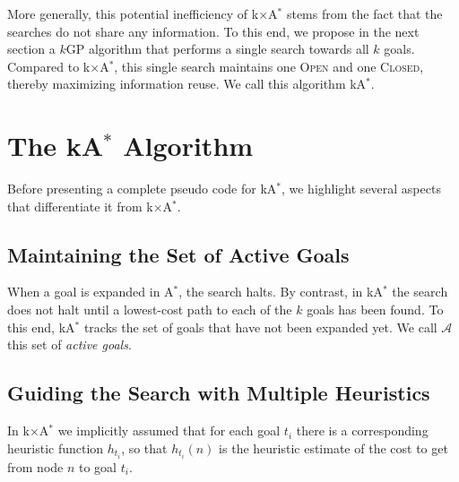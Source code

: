 \documentclass[twoside,11pt]{article}
\newcommand{\kgs}{$k$GP\xspace}
\newcommand{\astar}{A$^*$\xspace}
\newcommand{\kastar}{kA$^*$\xspace}
\newcommand{\kxastar}{k$\times$A$^*$\xspace}
\newcommand{\open}{\textsc{Open}\xspace}
\newcommand{\closed}{\textsc{Closed}\xspace}
\newcommand{\activeg}{\mathcal{A}}
\begin{document}
More generally, this potential inefficiency of \kxastar stems from the fact that the searches do not share any information. To this end, we propose in the next section a \kgs algorithm that performs a single search towards all $k$ goals. Compared to \kxastar, this single search maintains one  \open and one \closed, thereby maximizing information reuse. We call this algorithm \kastar. 



\section{The \kastar Algorithm}
\label{sec:one-k-goal-search}

Before presenting a complete pseudo code for \kastar, we highlight several aspects that differentiate it from \kxastar.


\subsection{Maintaining the Set of Active Goals}

When a goal is expanded in \astar, the search halts.
By contrast, in \kastar the search does not halt until a lowest-cost path to each of the $k$ goals has been found.
To this end, \kastar tracks the set of goals that have not been expanded yet. 
We call $\activeg$ this set of \emph{active goals}.

\subsection{Guiding the Search with Multiple Heuristics}

In \kxastar we implicitly assumed that for each goal $t_i$ there is a corresponding heuristic function $h_{t_i}$, so that $h_{t_i}(n)$ is the heuristic estimate of the cost to get from node $n$ to goal $t_i$. 
\end{document}
